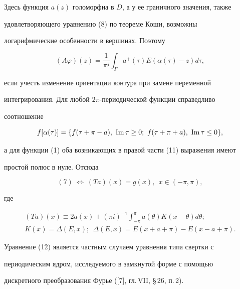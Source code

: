 Здесь функция $a(z)$ голоморфна в $D$, а у ее граничного значения, также  


удовлетворяющего уравнению (8) по теореме Коши, возможны  


логарифмические особенности в вершинах. Поэтому 


$$ 


(A\varphi)(z)=\frac{1}{\pi i}\int_\Gamma 


a^+(\tau)E(\alpha(\tau)-z)d\tau, 


$$ 


если учесть изменение ориентации контура при замене переменной 


интегрирования. Для любой $2\pi$-периодической функции справедливо 


соотношение  


\begin{equation} 


f[\alpha(\tau)]=\{f(\tau+\pi-a),\ \im \tau\ge0; 


\ f(\tau+\pi+a),\ \im\tau\le0\}, 


\end{equation} 


а для функции (1) оба возникающих в правой части (11) выражения имеют  


простой полюс в нуле. Отсюда 


\begin{equation} 


(7)\ \Leftrightarrow \ (T a)(x)=g(x),\ \ x\in(-\pi,\pi), 


\end{equation} 


где 


\begin{gather} 


(T a)(x)\equiv2a(x)+(\pi i)^{-1}\int^\pi_{-\pi} 


a(\theta)K(x-\theta)d\theta; \\ 


% 


K(x)=\Delta(E,x);\ \ \Delta(E,x)=E(x+a+\pi)- 


E(x-a+\pi). 


\end{gather} 


Уравнение (12) является частным случаем уравнения типа свертки с  


периодическим ядром, исследуемого в замкнутой форме с помощью  


дискретного преобразования Фурье ([7], гл.\,VII, \S\,26, п.\,2). 


